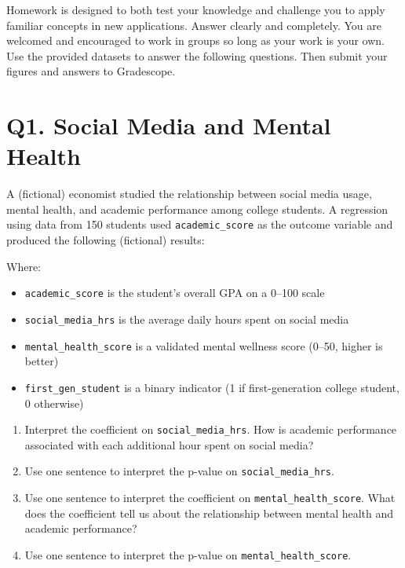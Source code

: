 \documentclass[12pt]{article}
\begin{document}
Homework is designed to both test your knowledge and challenge you to apply familiar concepts in new applications. Answer clearly and completely. You are welcomed and encouraged to work in groups so long as your work is your own. Use the provided datasets to answer the following questions. Then submit your figures and answers to Gradescope.

\section*{Q1. Social Media and Mental Health}

A (fictional) economist studied the relationship between social media usage, mental health, and academic performance among college students. A regression using data from 150 students used \texttt{academic\_score} as the outcome variable and produced the following (fictional) results:



Where:

\begin{itemize}
    \item \texttt{academic\_score} is the student's overall GPA on a 0--100 scale
    \item \texttt{social\_media\_hrs} is the average daily hours spent on social media
    \item \texttt{mental\_health\_score} is a validated mental wellness score (0--50, higher is better)
    \item \texttt{first\_gen\_student} is a binary indicator (1 if first-generation college student, 0 otherwise)
\end{itemize}

\begin{enumerate}[label=\alph*)]
    \item Interpret the coefficient on \texttt{social\_media\_hrs}. How is academic performance associated with each additional hour spent on social media?
    
    \vspace{2.5cm}
    
    \item Use one sentence to interpret the p-value on \texttt{social\_media\_hrs}.
    
    \vspace{2.5cm}
    
    \item Use one sentence to interpret the coefficient on \texttt{mental\_health\_score}. What does the coefficient tell us about the relationship between mental health and academic performance?
    
    \vspace{2.5cm}
    
    \item Use one sentence to interpret the p-value on \texttt{mental\_health\_score}.
    
    \vspace{2.5cm}
\end{enumerate}
\end{document}
